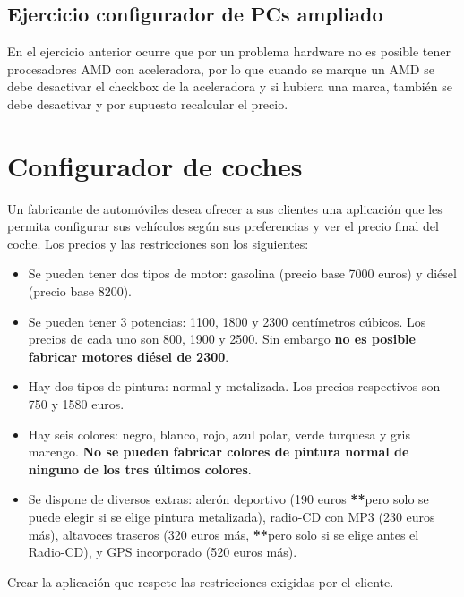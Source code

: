 \documentclass[letterpaper,10pt,spanish]{sphinxmanual}
\begin{document}
\subsection{Ejercicio configurador de PCs ampliado}
\label{tema4:ejercicio-configurador-de-pcs-ampliado}
En el ejercicio anterior ocurre que por un problema hardware no es posible tener procesadores AMD con aceleradora, por lo que cuando se marque un AMD se debe desactivar el checkbox de la aceleradora y si hubiera una marca, también se debe desactivar y por supuesto recalcular el precio.


\section{Configurador de coches}
\label{tema4:configurador-de-coches}
Un fabricante de automóviles desea ofrecer a sus clientes una aplicación que les permita configurar sus vehículos según sus preferencias y ver el precio final del coche. Los precios y las restricciones son los siguientes:
\begin{itemize}
\item {} 
Se pueden tener dos tipos de motor: gasolina (precio base 7000 euros) y diésel (precio base 8200).

\item {} 
Se pueden tener 3 potencias: 1100, 1800 y 2300 centímetros cúbicos. Los precios de cada uno son 800, 1900 y 2500. Sin embargo \textbf{no es posible fabricar motores diésel de 2300}.

\item {} 
Hay dos tipos de pintura: normal y metalizada. Los precios respectivos son 750 y 1580 euros.

\item {} 
Hay seis colores: negro, blanco, rojo, azul polar, verde turquesa y gris marengo. \textbf{No se pueden fabricar colores de pintura normal de ninguno de los tres últimos colores}.

\item {} 
Se dispone de diversos extras: alerón deportivo (190 euros {\color{red}\bfseries{}**}pero solo se puede elegir si se elige pintura metalizada), radio-CD con MP3 (230 euros más), altavoces traseros (320 euros más, {\color{red}\bfseries{}**}pero solo si se elige antes el Radio-CD), y GPS incorporado (520 euros más).

\end{itemize}

Crear la aplicación que respete las restricciones exigidas por el cliente.
\end{document}
